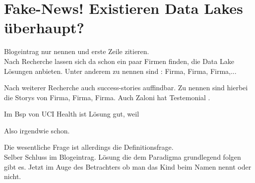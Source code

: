 \documentclass[twoside,twocolumn]{article}
\begin{document}
\section{Fake-News! Existieren Data Lakes überhaupt?}
Blogeintrag nur nennen und erste Zeile zitieren.\cite{src4}\\

Nach Recherche lassen sich da schon ein paar Firmen finden, die Data Lake Lösungen anbieten.
Unter anderem zu nennen sind : Firma\cite{c1}, Firma\cite{c2}, Firma\cite{c3},...

Nach weiterer Recherche auch success-stories auffindbar. 
Zu nennen sind hierbei die Storys von Firma\cite{ss1}, Firma\cite{ss2}, Firma\cite{ss3}. Auch Zaloni hat Testemonial \cite{ss4}.

Im Bsp von UCI Health ist Lösung gut, weil \cite{src1}\cite{ss2} 

Also irgendwie schon.


Die wesentliche Frage ist allerdings die Definitionsfrage.\\
Selber Schluss im Blogeintrag. Lösung die dem Paradigma grundlegend folgen gibt es. Jetzt im Auge des Betrachters ob man das Kind beim Namen nennt oder nicht.










\end{document}
